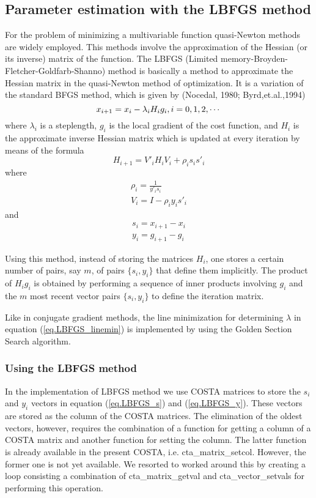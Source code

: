 \documentclass[a4paper,12pt]{article}
\begin{document}
\subsection{Parameter estimation with the LBFGS method}
For the problem of minimizing a multivariable function quasi-Newton methods
are widely employed. This methods involve the approximation of the Hessian
(or its inverse) matrix of the function. The LBFGS (Limited
memory-Broyden-Fletcher-Goldfarb-Shanno) method is basically a method to
approximate the Hessian matrix in the quasi-Newton method of optimization.
It is a variation of the standard BFGS method, which is given by (Nocedal,
1980; Byrd,et.al.,1994)
\begin{equation}
  \label{eq.LBFGS_linemin}
    x_{i+1}=x_i-\lambda_iH_ig_i, \space \space i=0,1,2,\cdots
\end{equation}
where $\lambda_i$ is a steplength, $g_i$ is the local gradient of the cost
function, and $H_i$ is the approximate inverse Hessian matrix which is
updated at every iteration by means of the formula
\begin{equation}
    H_{i+1}=V'_i H_i V_i + \rho_i s_i s'_i
\end{equation}
where
\begin{eqnarray}
    \rho_i=\frac{1}{y'_i s_i} \\
    V_i=I-\rho_i y_i s'_i
\end{eqnarray}
and
\begin{eqnarray}
    s_i=x_{i+1}-x_i \label{eq.LBFGS_s} \\
    y_i=g_{i+1}-g_i \label{eq.LBFGS_y}
\end{eqnarray}

Using this method, instead of storing the matrices $H_i$, one stores a
certain number of pairs, say $m$, of pairs $\{s_i,y_i\}$ that define them
implicitly. The product of $H_i g_i$ is obtained by performing a sequence
of inner products involving $g_i$ and the $m$ most recent vector pairs
$\{s_i,y_i\}$ to define the iteration matrix.

Like in conjugate gradient methods, the line minimization for determining
$\lambda$ in equation (\ref{eq.LBFGS_linemin}) is implemented by using the
Golden Section Search algorithm.

\subsubsection{Using the LBFGS method}
In the implementation of LBFGS method we use COSTA matrices to store the
$s_i$ and $y_i$ vectors in equation (\ref{eq.LBFGS_s}) and
(\ref{eq.LBFGS_y}). These vectors are stored as the column of the COSTA
matrices. The elimination of the oldest vectors, however, requires the
combination of a function for getting a column of a COSTA matrix and
another function for setting the column. The latter function is already
available in the present COSTA, i.e. cta\_matrix\_setcol. However, the
former one is not yet available. We resorted to worked around this by
creating a loop consisting a combination of cta\_matrix\_getval and
cta\_vector\_setvals for performing this operation. 
\end{document}
